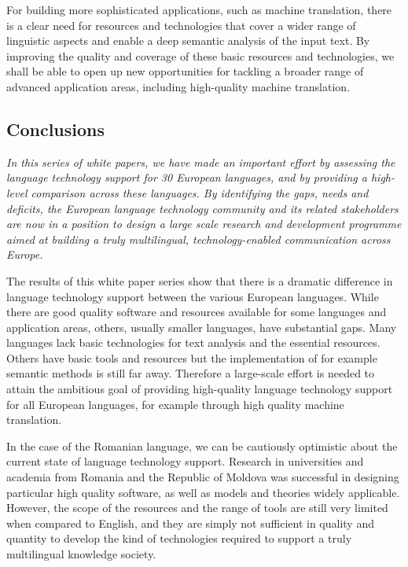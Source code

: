 \begin{multicols}{2}
For building more sophisticated applications, such as machine translation, there is a clear need for resources and technologies that cover a wider range of linguistic aspects and enable a deep semantic analysis of the input text. By improving the quality and coverage of these basic resources and technologies, we shall be able to open up new opportunities for tackling a broader range of advanced application areas, including high-quality machine translation.

\subsection{Conclusions}

\emph{In this series of white papers, we have made an important effort by assessing the language technology support for 30 European languages, and by providing a high-level comparison across these languages. By identifying the gaps, needs and deficits, the European language technology community and its related stakeholders are now in a position to design a large scale research and development programme aimed at building a truly multilingual, technology-enabled communication across Europe.}

The results of this white paper series show that there is a dramatic difference in language technology support between the various European languages. While there are good quality software and resources available for some languages and application areas, others, usually smaller languages, have substantial gaps. Many languages lack basic technologies for text analysis and the essential resources. Others have basic tools and resources but the implementation of for example semantic methods is still far away. Therefore a large-scale effort is needed to attain the ambitious goal of providing high-quality language technology support for all European languages, for example through high quality machine translation. 

In the case of the Romanian language, we can be cautiously optimistic about the current state of language technology support. Research in universities and academia from Romania and the Republic of Moldova was successful in designing particular high quality software, as well as models and theories widely applicable. However, the scope of the resources and the range of tools are still very limited when compared to English, and they are simply not sufficient in quality and quantity to develop the kind of technologies required to support a truly multilingual knowledge society.


\end{multicols}
